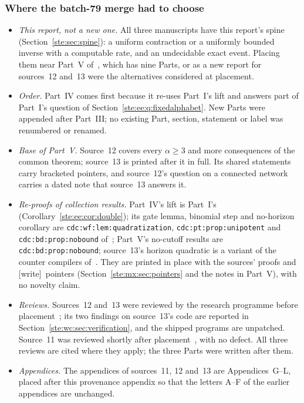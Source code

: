 \documentclass[11pt,letterpaper]{article}
\theoremstyle{definition}
\theoremstyle{remark}
\newcommand{\wtag}{\textup{[write]}}
\begin{document}
\subsubsection*{Where the batch-79 merge had to choose}
\begin{itemize}
\item \emph{This report, not a new one.} All three manuscripts have this report's spine (Section~\ref{ste:sec:spine}): a uniform contraction or a uniformly bounded inverse with a computable rate, and an undecidable exact event. Placing them near Part~V of~\cite{pqc}, which has nine Parts, or as a new report for sources~12 and~13 were the alternatives considered at placement.
\item \emph{Order.} Part~IV comes first because it re-uses Part~I's lift and answers part of Part~I's question of Section~\ref{ste:ee:q:fixedalphabet}. New Parts were appended after Part~III; no existing Part, section, statement or label was renumbered or renamed.
\item \emph{Base of Part~V.} Source~12 covers every $\alpha\geq3$ and more consequences of the common theorem; source~13 is printed after it in full. Its shared statements carry bracketed pointers, and source~12's question on a connected network carries a dated note that source~13 answers it.
\item \emph{Re-proofs of collection results.} Part~IV's lift is Part~I's (Corollary~\ref{ste:ee:cor:double}); its gate lemma, binomial step and no-horizon corollary are \texttt{cdc:wf:lem:quadratization}, \texttt{cdc:pt:prop:unipotent} and \texttt{cdc:bd:prop:nobound} of~\cite{cdc}; Part~V's no-cutoff results are \texttt{cdc:bd:prop:nobound}; source~13's horizon quadratic is a variant of the counter compilers of~\cite{lbh}. They are printed in place with the sources' proofs and \wtag\ pointers (Section~\ref{ste:mx:sec:pointers} and the notes in Part~V), with no novelty claim.
\item \emph{Reviews.} Sources~12 and~13 were reviewed by the research programme before placement~\cite{reviewCG}; its two findings on source~13's code are reported in Section~\ref{ste:wc:sec:verification}, and the shipped programs are unpatched. Source~11 was reviewed shortly after placement~\cite{reviewMX}, with no defect. All three reviews are cited where they apply; the three Parts were written after them.
\item \emph{Appendices.} The appendices of sources~11, 12 and~13 are Appendices~G--L, placed after this provenance appendix so that the letters A--F of the earlier appendices are unchanged.

\end{itemize}
\end{document}
